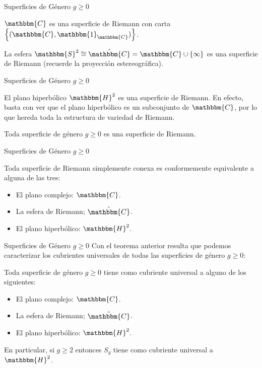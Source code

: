 \documentclass[xcolor=dvipsnames]{beamer}
\theoremstyle{largebreak}
\newcommand{\bbm}[1]{\ensuremath{\mathbbm{#1}}}
\begin{document}
\begin{frame}{Superficies de Género $g\geq0$}
    \begin{exa}
        $\bbm{C}$ es una superficie de Riemann con carta $\left\{(\bbm{C},\bbm{1}_{\bbm{C}})\right\}$.
    \end{exa}

    \begin{exa}
        La esfera $\bbm{S}^2\cong\hat{\bbm{C}}=\bbm{C}\cup\left\{\infty \right\}$ es una superficie de Riemann (recuerde la proyección estereográfica).
    \end{exa}
\end{frame}

\begin{frame}{Superficies de Género $g\geq0$}
    \begin{exa}
        El plano hiperbólico $\bbm{H}^2$ es una superficie de Riemann. En efecto, basta con ver que el plano hiperbólico es un subconjunto de $\bbm{C}$, por lo que hereda toda la estructura de variedad de Riemann.
    \end{exa}

    \begin{exa}
        Toda superficie de género $g\geq0$ es una superficie de Riemann. 
    \end{exa}
\end{frame}

\begin{frame}{Superficies de Género $g\geq0$}
    \begin{theor}
        Toda superficie de Riemann simplemente conexa es conformemente equivalente a alguna de las tres:
        \begin{itemize}
            \item El plano complejo: $\bbm{C}$.
            \item La esfera de Riemann; $\hat{\bbm{C}}$.
            \item El plano hiperbólico: $\bbm{H}^2$.
        \end{itemize}
    \end{theor}
\end{frame}

\begin{frame}{Superficies de Género $g\geq0$}
    Con el teorema anterior resulta que podemos caracterizar los cubrientes universales de todas las superficies de género $g\geq0$:

    \begin{propo}
        Toda superficie de género $g\geq0$ tiene como cubriente universal a alguno de los siguientes:
        \begin{itemize}
            \item El plano complejo: $\bbm{C}$.
            \item La esfera de Riemann; $\hat{\bbm{C}}$.
            \item El plano hiperbólico: $\bbm{H}^2$.
        \end{itemize}
        En particular, si $g\geq2$ entonces $S_g$ tiene como cubriente universal a $\bbm{H}^2$.
    \end{propo}
\end{frame}
\end{document}
